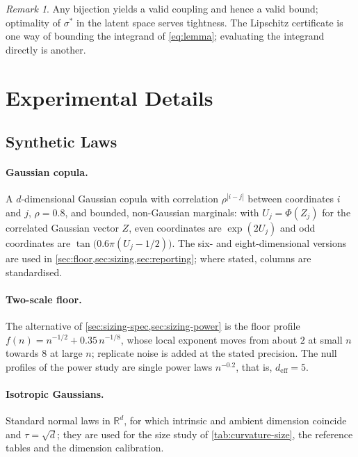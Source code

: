 \documentclass[twoside,11pt]{article}
\theoremstyle{plain}
\theoremstyle{definition}
\theoremstyle{remark}
\newtheorem{rem}{Remark}
\newcommand{\deff}{\ensuremath{d_{\mathrm{eff}}}}
\newcommand{\R}{\ensuremath{\mathbb{R}}}
\begin{document}
\begin{rem}
Any bijection yields a valid coupling and hence a valid bound; optimality
of $\sigma^{*}$ in the latent space serves tightness. The Lipschitz
certificate is one way of bounding the integrand of \cref{eq:lemma};
evaluating the integrand directly is another.
\end{rem}

\section{Experimental Details}\label{app:details}

\subsection{Synthetic Laws}\label{app:details-laws}

\paragraph{Gaussian copula.} A $d$-dimensional Gaussian copula with
correlation $\rho^{|i-j|}$ between coordinates $i$ and $j$, $\rho = 0.8$, and
bounded, non-Gaussian marginals: with $U_j = \Phi(Z_j)$ for the correlated
Gaussian vector $Z$, even coordinates are $\exp(2U_j)$ and odd coordinates
are $\tan\bigl(0.6\pi(U_j - 1/2)\bigr)$. The six- and eight-dimensional
versions are used in \cref{sec:floor,sec:sizing,sec:reporting}; where stated,
columns are standardised.

\paragraph{Two-scale floor.} The alternative of
\cref{sec:sizing-spec,sec:sizing-power} is the floor profile
$f(n) = n^{-1/2} + 0.35\, n^{-1/8}$, whose local exponent moves from about
$2$ at small $n$ towards $8$ at large $n$; replicate noise is added at the
stated precision. The null profiles of the power study are single power
laws $n^{-0.2}$, that is, $\deff = 5$.

\paragraph{Isotropic Gaussians.} Standard normal laws in $\R^d$, for which
intrinsic and ambient dimension coincide and $\tau = \sqrt{d}$; they are
used for the size study of \cref{tab:curvature-size}, the reference tables and the
dimension calibration.
\end{document}
